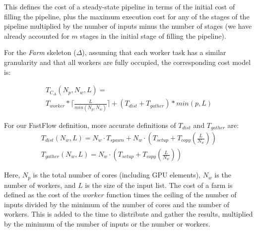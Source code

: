 \documentclass[smallextended]{svjour3}
\begin{document}
\noindent
This defines the cost of a steady-state pipeline in terms of the
initial cost of filling the pipeline, plus the maximum execution cost for
any of the stages of the pipeline multiplied by the number of inputs minus the number of stages 
(we have already accounted for $m$ stages in the initial stage of filling the pipeline).

%

%
%

%
For the \emph{Farm} skeleton ($\Delta$), 
assuming that each worker task has a similar granularity and that all
workers are fully occupied, the corresponding cost model is: %

\begin{multline}
T_{C_{\Delta}}(N_{p}, N_{w}, L) = \\ T_{worker} * \lceil \frac{L}{min(N_{p}, N_{w})} \rceil + (T_{dist} + T_{gather}) * min (p, L)
\end{multline}

\noindent
For our  FastFlow definition, more accurate definitions of $T_{dist}$ and $T_{gather}$ are:
\begin{multline}
T_{dist}(N_w,L) = N_w \cdot T_{spawn} + N_w \cdot (T_{setup} + T_{copy}(\frac{L}{N_{w}})) \\
T_{gather}(N_w,L) = N_w \cdot (T_{setup} + T_{copy}(\frac{L}{N_{w}})) 
\end{multline}

\noindent
Here, $N_{p}$ is the total number of cores (including GPU elements), $N_{w}$ is the number of workers, and $L$ is the size of the input list.
The cost of a farm is defined as the cost of the $worker$ function times the ceiling of the number of inputs divided by the minimum of the number of cores and the number of workers. This is added to the time to distribute and gather the results, multiplied by the minimum of the number of inputs or the number or workers.
\end{document}
